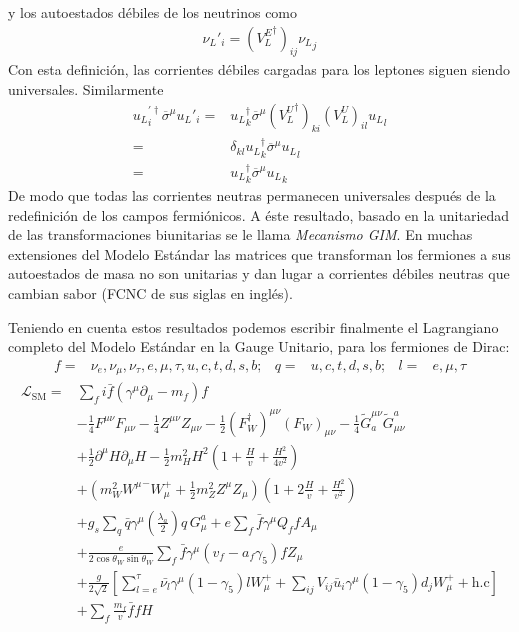 \begin{frame}
y los autoestados débiles de los neutrinos como
\begin{align}
  {\nu_L}'_i=({V^E_L}^\dagger)_{ij}{\nu_L}_j
\end{align}
Con esta definición, las corrientes débiles cargadas para los leptones siguen siendo universales. Similarmente
\begin{align}
   {u_L}^{\prime\dagger}_i \overline{\sigma}^\mu{u_L}'_i=&{u_L}^{\dagger}_k\overline{\sigma}^\mu({V^U_L}^\dagger)_{ki}(V^U_L)_{il} {u_L}_l\nonumber\\
  =&\delta_{kl}{u_L}^{\dagger}_k \overline{\sigma}^\mu{u_L}_l\nonumber\\
  =&{u_L}^{\dagger}_k\overline{\sigma}^\mu {u_L}_k
 \end{align}
De modo que todas las corrientes neutras permanecen universales después de la redefinición de los campos fermiónicos. A éste resultado, basado en la unitariedad de las transformaciones biunitarias se le llama \emph{Mecanismo GIM}. En muchas extensiones del Modelo Estándar las matrices que transforman los fermiones a sus autoestados de masa no son unitarias y dan lugar a corrientes débiles neutras que cambian sabor (FCNC de sus siglas en inglés). 

\newpage{}

Teniendo en cuenta estos resultados podemos escribir finalmente el Lagrangiano completo del Modelo Estándar en la Gauge Unitario, para los fermiones de Dirac:
\begin{align}
  f=&\nu_e,\nu_\mu,\nu_\tau,e,\mu,\tau,u,c,t,d,s,b;&q=&u,c,t,d,s,b;&l=&e,\mu,\tau
\end{align}
\begin{align}
   \mathcal{L}_{\text{SM}}=&\sum_f i\bar{f}\left(\gamma^\mu\partial_\mu-m_f\right)f\nonumber\\
&-\tfrac{1}{4}F^{\mu\nu} F_{\mu\nu}-\tfrac{1}{4}Z^{\mu\nu} Z_{\mu\nu}-\tfrac{1}{2}(F_W^\dagger)^{\mu\nu} (F_W)_{\mu\nu}
- \tfrac{1}{4}\widetilde{G}^{\mu\nu}_a \widetilde{G}_{\mu\nu}^a\nonumber\\
&+\tfrac{1}{2}\partial^\mu H\partial_\mu H
-\frac{1}{2}m_H^2H^2\left(1+\frac{H}{v}+\frac{H^2}{4v^2}\right)\nonumber\\
&+\left(m_W^2{W^\mu}^-W_\mu^++\frac{1}{2}m_Z^2Z^\mu Z_\mu\right)\left(1+2\frac{H}{v}+\frac{H^2}{v^2}\right)\nonumber\\
&+g_s\sum_q\bar{q}\gamma^\mu\left(\frac{\lambda_a}{2}\right)q\,G_\mu^a+e\sum_f \bar{f}\gamma^\mu Q_f f A_\mu\nonumber\\
&+\frac{e}{2\cos\theta_W\sin\theta_W}\sum_{f}\bar{f}\gamma^\mu(v_f-a_f\gamma_5)f Z_\mu\nonumber\\
&+\frac{g}{2\sqrt{2}}\left[\sum_{l=e}^{\tau}\bar{\nu_l}\gamma^\mu(1-\gamma_5)l W_\mu^++\sum_{ij}V_{ij}\bar{u}_i\gamma^\mu(1-\gamma_5)d_j W_\mu^++\text{h.c}\right]\nonumber\\
&+\sum_f \frac{m_f}{v} \bar{f}f H\nonumber
\end{align}

\end{frame}

